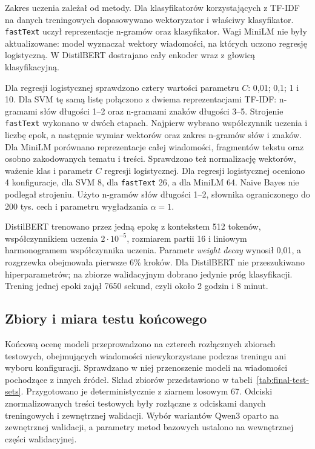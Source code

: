 Zakres uczenia zależał od metody. Dla klasyfikatorów korzystających z TF-IDF
na danych treningowych dopasowywano wektoryzator i właściwy klasyfikator.
\texttt{fastText} uczył reprezentacje n-gramów oraz klasyfikator.
Wagi MiniLM nie były aktualizowane: model wyznaczał wektory wiadomości, na
których uczono regresję logistyczną. W DistilBERT dostrajano cały enkoder wraz z
głowicą klasyfikacyjną.

Dla regresji logistycznej sprawdzono cztery wartości parametru \(C\): 0,01;
0,1; 1 i 10. Dla SVM tę samą listę połączono z dwiema reprezentacjami
TF-IDF: n-gramami słów długości 1--2 oraz n-gramami znaków długości 3--5.
Strojenie \texttt{fastText} wykonano w dwóch etapach. Najpierw wybrano
współczynnik uczenia i liczbę epok, a następnie wymiar wektorów oraz zakres
n-gramów słów i znaków. Dla MiniLM porównano reprezentacje całej wiadomości,
fragmentów tekstu oraz osobno zakodowanych tematu i treści. Sprawdzono też
normalizację wektorów, ważenie klas i parametr \(C\) regresji logistycznej.
Dla regresji logistycznej oceniono 4 konfiguracje, dla SVM 8, dla
\texttt{fastText} 26, a dla MiniLM 64. Naive Bayes nie podlegał strojeniu.
Użyto n-gramów słów długości 1--2, słownika ograniczonego do 200 tys. cech i
parametru wygładzania \(\alpha=1\).

\begin{table}[htbp]
\centering
\scriptsize
\resizebox{\textwidth}{!}{}
\caption{Konfiguracje metod bazowych wybrane na zbiorze walidacyjnym.}
\label{tab:sota-tuned-configurations}
\end{table}

DistilBERT trenowano przez jedną epokę z kontekstem 512 tokenów,
współczynnikiem uczenia \(2\cdot10^{-5}\), rozmiarem partii 16 i liniowym
harmonogramem współczynnika uczenia. Parametr \emph{weight decay} wynosił
0,01, a rozgrzewka obejmowała pierwsze 6\% kroków. Dla DistilBERT nie
przeszukiwano hiperparametrów; na zbiorze walidacyjnym dobrano jedynie próg
klasyfikacji. Trening jednej epoki zajął 7650 sekund, czyli około 2 godzin i
8 minut.

\subsection{Zbiory i miara testu końcowego}

Końcową ocenę modeli przeprowadzono na czterech rozłącznych zbiorach testowych,
obejmujących wiadomości niewykorzystane podczas treningu ani wyboru
konfiguracji. Sprawdzano w niej przenoszenie modeli na wiadomości pochodzące z
innych źródeł. Skład zbiorów przedstawiono w
tabeli~\ref{tab:final-test-sets}. Przygotowano je
deterministycznie z ziarnem losowym 67. Odciski znormalizowanych treści
testowych były rozłączne z odciskami danych treningowych i zewnętrznej
walidacji.
Wybór wariantów Qwen3 oparto na zewnętrznej walidacji, a parametry metod bazowych
ustalono na wewnętrznej części walidacyjnej.

